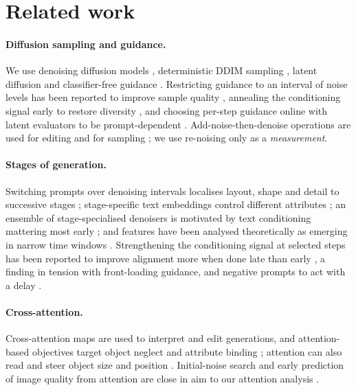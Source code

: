 \section{Related work}\label{sec:related}
\paragraph{Diffusion sampling and guidance.} We use denoising diffusion models \citep{ho2020ddpm}, deterministic DDIM sampling \citep{song2021ddim}, latent diffusion \citep{rombach2022ldm} and classifier-free guidance \citep{ho2022cfg}. Restricting guidance to an interval of noise levels has been reported to improve sample quality \citep{kynkaanniemi2024interval}, annealing the conditioning signal early to restore diversity \citep{sadat2024cads}, and choosing per-step guidance online with latent evaluators to be prompt-dependent \citep{dynamiccfg2025}. Add-noise-then-denoise operations are used for editing and for sampling \citep{meng2022sdedit,xu2023restart}; we use re-noising only as a \emph{measurement}.

\paragraph{Stages of generation.} Switching prompts over denoising intervals localises layout, shape and detail to successive stages \citep{patashnik2023mixing}; stage-specific text embeddings control different attributes \citep{zhang2023prospect}; an ensemble of stage-specialised denoisers is motivated by text conditioning mattering most early \citep{balaji2022ediffi}; and features have been analysed theoretically as emerging in narrow time windows \citep{li2024critical}. Strengthening the conditioning signal at selected steps has been reported to improve alignment more when done late than early \citep{grimal2025step}, a finding in tension with front-loading guidance, and negative prompts to act with a delay \citep{ban2024negative}.

\paragraph{Cross-attention.} Cross-attention maps are used to interpret \citep{tang2023daam} and edit \citep{hertz2023p2p} generations, and attention-based objectives target object neglect and attribute binding \citep{chefer2023attend,li2023divide,fu2024gather,rassin2023syngen}; attention can also read and steer object size and position \citep{epstein2023selfguidance}. Initial-noise search and early prediction of image quality from attention are close in aim to our attention analysis \citep{guo2024initno,diffusionprobe2026}.

